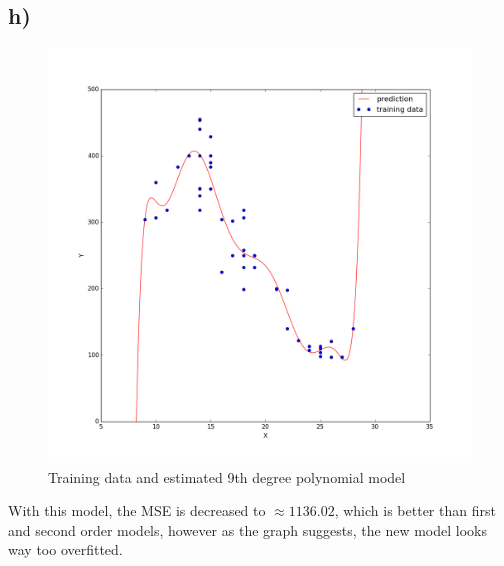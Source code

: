 \documentclass{article}
\begin{document}
\subsection*{h)}
\begin{figure}[H]
	\centering
	\includegraphics[scale=0.25]{31h.png}
	\caption{Training data and estimated 9th degree polynomial model}
	\label{fig7}
\end{figure}
With this model, the MSE is decreased to $\approx 1136.02$, which is better than first and second order models, however as the graph suggests, the new model looks way too overfitted.
\end{document}
